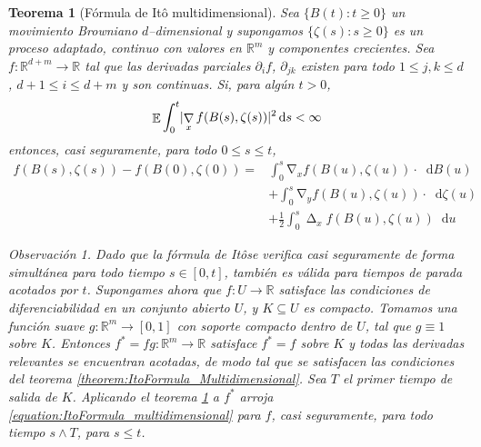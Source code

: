 \documentclass{article}
\newcommand{\ito}{Itô}
\newcommand{\dd}{\mathop{}\!\mathrm{d}}
\newcommand{\realNumbers}{\mathbb{R}}
\DeclareMathOperator{\laplacian}{\Delta}
\DeclareMathOperator{\grad}{\nabla}
\DeclareMathOperator{\Expectation}{\mathbb{E}}
\DeclarePairedDelimiter{\abs}{\lvert}{\rvert}
\theoremstyle{plain}
\newtheorem{theorem}{Teorema}
\theoremstyle{remark}
\newtheorem{remark}{Observación}
\theoremstyle{definition}
\begin{document}
\begin{theorem}[Fórmula de \ito{} multidimensional]
  \label{theorem:ItoFormula_multidimensional}
  Sea \(\{B(t) : t \geq 0\}\) un movimiento Browniano \(d\)--dimensional y supongamos \(\{\zeta(s) : s \geq 0\}\) es un proceso adaptado, continuo con valores en \(\realNumbers^m\) y componentes crecientes.
  Sea \(f : \realNumbers^{d + m} \rightarrow \realNumbers\) tal que las derivadas parciales \(\partial_i f\), \(\partial_{j k}\) existen para todo \(1 \leq j, k \leq d\), \(d + 1 \leq i \leq d + m\) y son continuas.
  Si, para algún \(t > 0\),
  \begin{align}
    \Expectation \int_0^t \abs{\grad_x f(B(s), \zeta(s))}^2 \dd s
    <
    \infty
  \end{align}
  entonces, casi seguramente, para todo \(0 \leq s \leq t\),
  \begin{align}
    f(B(s), \zeta(s)) - f(B(0), \zeta(0))
    =
    &\int_0^s \grad_x f(B(u), \zeta(u)) \cdot \dd B(u)
    \nonumber
    \\
    &+ \int_0^s \grad_y f(B(u), \zeta(u)) \cdot \dd \zeta(u)
    \nonumber
    \\
    &+ \frac{1}{2} \int_0^s \laplacian_x f(B(u), \zeta(u)) \dd u
    \label{equation:ItoFormula_multidimensional}
  \end{align}
  \begin{remark}
    Dado que la fórmula de \ito se verifica casi seguramente de forma simultánea para todo tiempo \(s \in [0, t]\), también es válida para tiempos de parada acotados por \(t\).
    Supongames ahora que \(f : U \rightarrow \realNumbers\) satisface las condiciones de diferenciabilidad en un conjunto abierto \(U\), y \(K \subseteq U\) es compacto.
    Tomamos una función suave \(g : \realNumbers^m \rightarrow [0, 1]\) con soporte compacto dentro de \(U\), tal que \(g \equiv 1\) sobre \(K\).
    Entonces \(f^* = f g : \realNumbers^m \rightarrow \realNumbers\) satisface \(f^* = f\) sobre \(K\) y todas las derivadas relevantes se encuentran acotadas, de modo tal que se satisfacen las condiciones del teorema \ref{theorem:ItoFormula_Multidimensional}.
    Sea \(T\) el primer tiempo de salida de \(K\).
    Aplicando el teorema \ref{theorem:ItoFormula_multidimensional} a \(f^*\) arroja \eqref{equation:ItoFormula_multidimensional} para \(f\), casi seguramente, para todo tiempo \(s \wedge T\), para \(s \leq t\).
  \end{remark}
\end{theorem}
\end{document}
